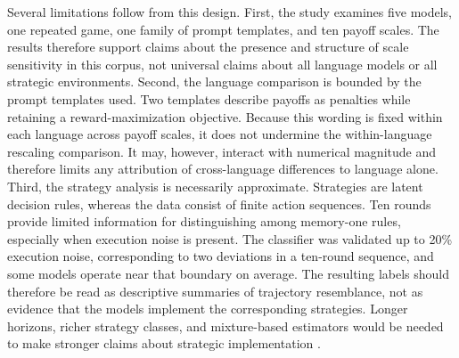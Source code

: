 \documentclass[11pt,a4paper]{article}
\begin{document}
Several limitations follow from this design. First, the study examines five models, one repeated game, one family of prompt templates, and ten payoff scales. The results therefore support claims about the presence and structure of scale sensitivity in this corpus, not universal claims about all language models or all strategic environments. Second, the language comparison is bounded by the prompt templates used. Two templates describe payoffs as penalties while retaining a reward-maximization objective. Because this wording is fixed within each language across payoff scales, it does not undermine the within-language rescaling comparison. It may, however, interact with numerical magnitude and therefore limits any attribution of cross-language differences to language alone.
Third, the strategy analysis is necessarily approximate. Strategies are latent decision rules, whereas the data consist of finite action sequences. Ten rounds provide limited information for distinguishing among memory-one rules, especially when execution noise is present. The classifier was validated up to 20\% execution noise, corresponding to two deviations in a ten-round sequence, and some models operate near that boundary on average. The resulting labels should therefore be read as descriptive summaries of trajectory resemblance, not as evidence that the models implement the corresponding strategies. Longer horizons, richer strategy classes, and mixture-based estimators would be needed to make stronger claims about strategic implementation \cite{inferenceStrategies,hilbe2013memory,han2013intention}.
\end{document}
